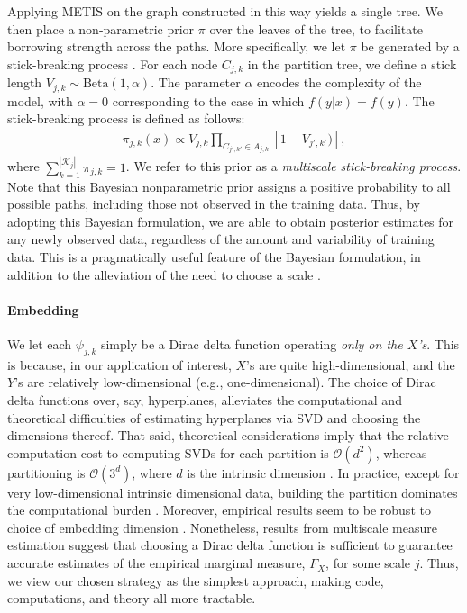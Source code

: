 \documentclass{article} %
\providecommand{\mc}[1]{\mathcal{#1}}
\begin{document}
	Applying METIS on the graph constructed in this way yields a single tree.  We then place a non-parametric prior $\pi$ over the leaves of the tree, to facilitate borrowing strength across the paths.  More specifically, we let $\pi$ be generated by a stick-breaking process \cite{stickbreaking}.  For each node $C_{j,k}$ in the partition tree, we define a stick length $V_{j,k} \sim \mbox{Beta}(1,\alpha)$.  The parameter $\alpha$ encodes the complexity of the model, with $\alpha=0$ corresponding to the case in which $f(y|x) = f(y)$. The stick-breaking process is defined as follows: 
	\begin{eqnarray*}
	\pi_{j,k}(x) \propto V_{j,k} \prod_{C_{j',k'} \in A_{j,k}} \left[1 - V_{j',k'}) \right],
	\end{eqnarray*}
	where  $\sum_{k=1}^{|\mc{K}_j|} \pi_{j,k} = 1$.   We refer to this prior as a {\em multiscale stick-breaking process}. Note that this Bayesian nonparametric prior assigns a positive probability to all possible paths, including those not observed in the training data.  Thus, by adopting this Bayesian formulation, we are able to obtain posterior estimates for any newly observed data, regardless of the amount and variability of training data.  This is a pragmatically useful feature of the Bayesian formulation, in addition to the alleviation of the need to choose a scale \cite{ChenMaggioni12}.  %


\paragraph{Embedding} We let each $\psi_{j,k}$ simply be a Dirac delta function operating \emph{only on the $X$'s}.  This is because, in our application of interest, $X$'s are quite high-dimensional, and the $Y$'s are relatively low-dimensional (e.g., one-dimensional).  The choice of Dirac delta functions over, say, hyperplanes, alleviates the computational and theoretical difficulties of estimating hyperplanes via SVD and choosing the dimensions thereof. That said,  theoretical considerations imply that the relative computation cost to computing SVDs for each partition is $\mc{O}(d^2)$, whereas partitioning  is  
$\mc{O}(3^d)$, where $d$ is the intrinsic dimension \cite{Allard2012}. In practice, except for very low-dimensional intrinsic dimensional data, building the partition dominates the computational burden \cite{Allard2012}.  Moreover, empirical results seem to be robust to choice of embedding dimension \cite{Lawlor2012}. Nonetheless, results from multiscale measure estimation \cite{ChenMaggioni12} suggest that choosing a Dirac delta function is sufficient to guarantee accurate estimates of the empirical marginal measure, $F_X$, for some scale $j$.  Thus, we view our chosen strategy as the simplest approach, making code, computations, and theory all more tractable.  
\end{document}
